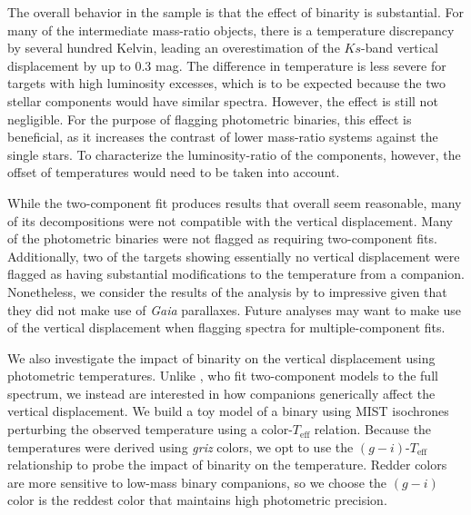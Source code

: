 \documentclass[twocolumn]{aastex6}
\newcommand{\Gaia}{\mbox{\textit{Gaia}}}
\newcommand{\Teff}{\ensuremath{T_{\textrm{eff}}}}
\begin{document}
The overall behavior in the \citet{ElBadry18b} sample is that the effect of 
binarity is substantial. For many of the intermediate mass-ratio objects, there
is a temperature discrepancy by several hundred Kelvin, leading an 
overestimation of the \(Ks\)-band vertical displacement by up to 
0.3 mag. The difference in temperature is less severe for targets with high 
luminosity excesses, which is to be expected because the two stellar 
components would have similar spectra. However, the effect is still 
not negligible. For the purpose of flagging photometric binaries, this effect
is beneficial, as it increases the contrast of lower mass-ratio systems
against the single stars. To characterize the luminosity-ratio of the 
components, however, the offset of temperatures would need to be taken into 
account. 

While the two-component fit produces results that overall seem reasonable, many
of its decompositions were not compatible with the vertical displacement. Many
of the photometric binaries were not flagged as requiring two-component fits.
Additionally, two of the targets showing essentially no vertical displacement
were flagged as having substantial modifications to the temperature from a
companion. Nonetheless, we consider the results of the analysis by 
\citet{ElBadry18b} to impressive given that they did not make use of \Gaia{} 
parallaxes. Future analyses may want to make use of the vertical displacement 
when flagging spectra for multiple-component fits.

We also investigate the impact of binarity on the vertical displacement using
photometric temperatures. Unlike \citet{ElBadry18}, who fit two-component
models to the full spectrum, we instead are interested in how companions
generically affect the vertical displacement. We build a toy model of a binary
using MIST isochrones perturbing the observed temperature using a
color-\Teff{} relation. Because the \citet{Pinsonneault12} temperatures were 
derived using \textit{griz} colors, we opt to use the \((g-i)\)-\Teff{} 
relationship to probe the impact of binarity on the temperature. Redder colors
are more sensitive to low-mass binary companions, so we choose the 
\( (g-i) \) color is the reddest color that maintains high photometric precision.
\end{document}
